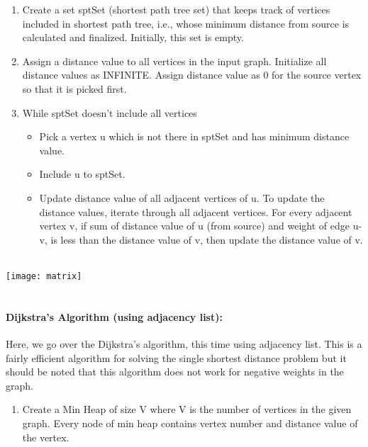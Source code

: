 \documentclass[10pt]{article}
\begin{document}
\begin{multicols*}{2}
\begin{enumerate}
    \item Create a set sptSet (shortest path tree set)  that keeps track of vertices included in  
shortest path tree, i.e., whose minimum  distance from source is calculated and 
finalized. Initially, this set is empty. 
\item  Assign a distance value to all vertices in  the input graph. Initialize all distance  
values as INFINITE. Assign distance  value as 0 for the source vertex so that it  is picked first. 
\item While sptSet doesn’t include all vertices 
\begin{itemize}
  \item Pick a vertex u which is not  there in sptSet and has minimum  distance value.
  \item Include u to sptSet. 
  \item Update distance value of all  adjacent vertices of u. To update  the distance values, iterate  through all adjacent vertices. For  every    adjacent vertex v, if sum  of distance value of u (from  source) and weight of edge u-v,  is less than the distance value of  v, then update the distance value  of v. \\\\
\end{itemize}


\end{enumerate}

\texttt{[image: matrix]}\\\\

\columnbreak


\paragraph{Dijkstra's Algorithm (using adjacency list):}

Here, we go over the Dijkstra's algorithm, this time using adjacency list. This is a fairly efficient algorithm for solving the single shortest distance problem but it should be noted  that this algorithm does not work for negative weights in the graph. 
\begin{enumerate}

\item Create a Min Heap of size V where V is  the number of vertices in the given graph.  Every node of min heap contains vertex  number and distance value of the vertex. 



\end{enumerate}
\end{multicols*}
\end{document}
